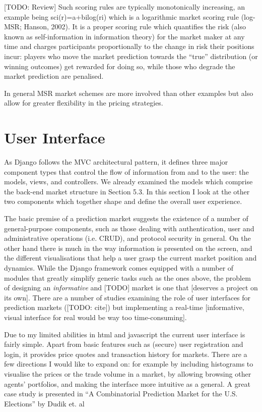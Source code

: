 \documentclass[bsc,frontabs,twoside,singlespacing,parskip,deptreport]{infthesis}     %
\begin{document}
 [TODO: Review] Such scoring rules are typically monotonically increasing, an example being sci(r)=a+bilog(ri) which is a logarithmic market scoring rule (log-MSR; Hanson, 2002). It is a proper scoring rule which quantifies the risk (also known as self-information in information theory) for the market maker at any time and charges participants proportionally to the change in risk their positions incur: players who move the market prediction towards the “true” distribution (or winning outcomes) get rewarded for doing so, while those who degrade the market prediction are penalised.

In general MSR market schemes are more involved than other examples but also allow for greater flexibility in the pricing strategies.

\section{User Interface}

	As Django follows the MVC architectural pattern, it defines three major component types that control the flow of information from and to the user: the models, views, and controllers. We already examined the models which comprise the back-end market structure in Section 5.3. In this section I look at the other two components which together shape and define the overall user experience. 

	The basic premise of a prediction market suggests the existence of a number of general-purpose components, such as those dealing with authentication, user and administrative operations (i.e. CRUD), and protocol security in general. On the other hand there is much in the way information is presented on the screen, and the different visualisations that help a user grasp the current market position and dynamics. While the Django framework comes equipped with a number of modules that greatly simplify generic tasks such as the ones above, the problem of designing an {\em informative} and [TODO] market is one that [deserves a project on its own]. There are a number of studies examining the role of user interfaces for prediction markets ([TODO: cite]) but implementing a real-time [informative, visual interface for real would be way too time-consuming]. 


    Due to my limited abilities in html and javascript the current user interface is fairly simple. Apart from basic features such as (secure) user registration and login, it provides price quotes and transaction history for markets. There are a few directions I would like to expand on: for example by including histograms to visualise the prices or the trade volume in a market, by allowing browsing other agents’ portfolios, and making the interface more intuitive as a general. A great case study is presented in “A Combinatorial Prediction Market for the U.S. Elections” by Dudik et. al
\end{document}

